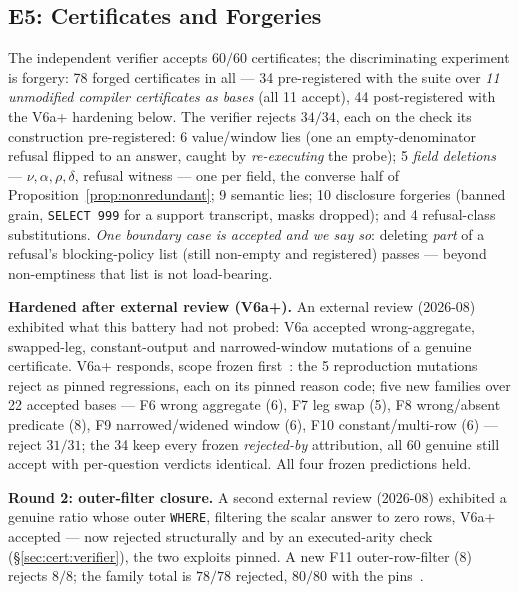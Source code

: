 \subsection{E5: Certificates and Forgeries}
\label{sec:eval-cert}

 The independent verifier accepts $60/60$ certificates; the
discriminating experiment is forgery: 78 forged certificates in all --- 34
pre-registered with the suite over \emph{11 unmodified compiler certificates
as bases} (all 11 accept), 44 post-registered with the V6a+ hardening below.
The verifier rejects $34/34$, each on the check its construction
pre-registered: 6 value/window lies (one an empty-denominator refusal flipped
to an answer, caught by \emph{re-executing} the probe); 5 \emph{field
deletions} --- $\nu,\alpha,\rho,\delta$, refusal witness --- one per field, the
converse half of Proposition~\ref{prop:nonredundant}; 9 semantic lies; 10
disclosure forgeries (banned grain, \texttt{SELECT 999} for a support
transcript, masks dropped); and 4 refusal-class substitutions. \emph{One
boundary case is accepted and we say so}: deleting \emph{part} of a refusal's
blocking-policy list (still non-empty and registered) passes --- beyond
non-emptiness that list is not load-bearing.

\smallskip\noindent{}\textbf{Hardened after external review
(V6a+).} An external review (2026-08) exhibited what this battery had not
probed: V6a accepted wrong-aggregate, swapped-leg, constant-output and
narrowed-window mutations of a genuine certificate. V6a+ responds, scope
frozen first~\cite{asofgov-tr}: the 5 reproduction mutations
reject as pinned regressions, each on its pinned reason code; five new
families over 22 accepted bases --- F6 wrong aggregate (6), F7 leg swap
(5), F8 wrong/absent predicate (8), F9 narrowed/widened
window (6), F10 constant/multi-row (6) --- reject $31/31$; the 34 keep every
frozen \emph{rejected-by} attribution, all 60 genuine still accept with
per-question verdicts identical. All four frozen predictions held.

\smallskip\noindent{}\textbf{Round 2: outer-filter closure.} A
second external review (2026-08) exhibited a genuine ratio whose outer
\texttt{WHERE}, filtering the scalar answer to zero rows, V6a+ accepted --- now
rejected structurally and by an executed-arity check
(\S\ref{sec:cert:verifier}), the two exploits pinned. A new F11
outer-row-filter (8) rejects $8/8$; the family total is $78/78$ rejected,
$80/80$ with the pins~\cite{asofgov-tr}.

